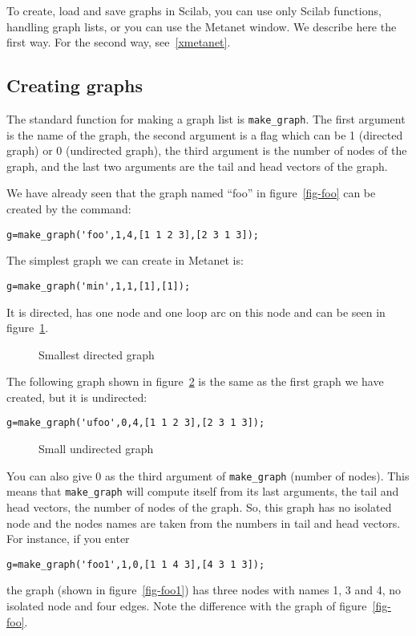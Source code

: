 \documentclass[11pt]{article}
\newcommand{\func}[1]{\texttt{#1}}
\begin{document}
To create, load and save graphs in Scilab, you can use only Scilab
functions, handling graph lists, or you can use the Metanet window.
We describe here the first way. For the second way, see~\ref{xmetanet}.

\subsection{Creating graphs}\label{creating}

The standard function for making a graph list is
\func{make\_graph}.
The first argument is the name of the graph,
the second argument is a flag which can be 1 (directed graph) or 0
(undirected graph), the third argument is the number of nodes of the graph,
and the last two arguments are the tail
and head
vectors of 
the graph.

We have already seen that the graph named ``foo'' in figure~\ref{fig-foo}
can be created by the command:
\begin{verbatim}
g=make_graph('foo',1,4,[1 1 2 3],[2 3 1 3]);
\end{verbatim}

The simplest graph we can create in Metanet is:
\begin{verbatim}
g=make_graph('min',1,1,[1],[1]);
\end{verbatim}
It is directed, has one node and one loop arc on this node and can be
seen in figure~\ref{fig-min}.
\begin{figure}
  \begin{center}\end{center}
  \caption{Smallest directed graph}
  \label{fig-min}
\end{figure}

The following graph shown in figure~\ref{fig-ufoo} is the same as
the first graph we have created, but it 
is undirected:
\begin{verbatim}
g=make_graph('ufoo',0,4,[1 1 2 3],[2 3 1 3]);
\end{verbatim}

\begin{figure}
  \begin{center}\end{center}
  \caption{Small undirected graph}
  \label{fig-ufoo}
\end{figure}

You can also give 0 as the third argument of \func{make\_graph}
(number of nodes). This
means that \func{make\_graph} will compute itself from its last
arguments, the tail and head vectors, the number of nodes of the graph.
So, this graph has no isolated node and the nodes names are
taken from the numbers in tail and head vectors.
For instance, if you enter
\begin{verbatim}
g=make_graph('foo1',1,0,[1 1 4 3],[4 3 1 3]);
\end{verbatim}
the graph (shown in figure~\ref{fig-foo1}) has three nodes with names
1, 3 and 4, no isolated node and four edges. Note the difference with
the graph of figure~\ref{fig-foo}.
\end{document}
